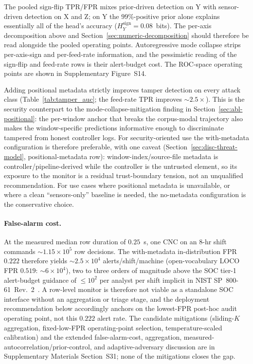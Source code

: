 \documentclass[sensors,article,submit,moreauthors,pdftex]{Definitions/mdpi}
\begin{document}
The pooled sign-flip TPR/FPR mixes prior-driven detection on Y with sensor-driven detection on X and Z; on Y the $99\%$-positive prior alone explains essentially all of the head's accuracy ($H_{Y}^{\text{sign}}=0.08$~bits). The per-axis decomposition above and Section~\ref{sec:numeric-decomposition} should therefore be read alongside the pooled operating points. Autoregressive mode collapse strips per-axis-sign and per-feed-rate information, and the pessimistic reading of the sign-flip and feed-rate rows is their alert-budget cost. The ROC-space operating points are shown in Supplementary Figure~S14.

Adding positional metadata strictly improves tamper detection on every attack class (Table~\ref{tab:tamper_auc}; the feed-rate TPR improves $\sim$$2.5\times$). This is the security counterpart to the mode-collapse-mitigation finding in Section~\ref{sec:abl-positional}: the per-window anchor that breaks the corpus-modal trajectory also makes the window-specific predictions informative enough to discriminate tampered from honest controller logs. For security-oriented use the with-metadata configuration is therefore preferable, with one caveat (Section~\ref{sec:disc-threat-model}, positional-metadata row): window-index/source-file metadata is controller/pipeline-derived while the controller is the untrusted element, so its exposure to the monitor is a residual trust-boundary tension, not an unqualified recommendation. For use cases where positional metadata is unavailable, or where a clean ``sensors-only'' baseline is needed, the no-metadata configuration is the conservative choice.

\paragraph{False-alarm cost.} At the measured median row duration of $0.25$~s, one CNC on an 8-hr shift commands $\sim$$1.15\!\times\!10^{5}$ row decisions. The with-metadata in-distribution FPR $0.222$ therefore yields $\sim$$2.5\!\times\!10^{4}$ alerts/shift/machine (open-vocabulary LOCO FPR $0.519$: $\sim$$6\!\times\!10^{4}$), two to three orders of magnitude above the SOC tier-1 alert-budget guidance of $\le\!10^{2}$ per analyst per shift implicit in NIST SP~800-61~Rev.~2~\cite{nist2012sp80061}. A row-level monitor is therefore not viable as a standalone SOC interface without an aggregation or triage stage, and the deployment recommendation below accordingly anchors on the lowest-FPR post-hoc audit operating point, not this $0.222$ alert rate. The candidate mitigations (sliding-$K$ aggregation, fixed-low-FPR operating-point selection, temperature-scaled calibration) and the extended false-alarm-cost, aggregation, measured-autocorrelation/prior-control, and adaptive-adversary discussion are in Supplementary Materials Section~S31; none of the mitigations closes the gap.
\end{document}
